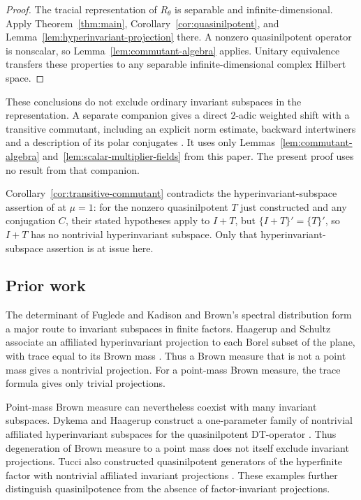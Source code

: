 \begin{proof}
The tracial representation of $R_\theta$ is separable and
infinite-dimensional.  Apply Theorem~\ref{thm:main},
Corollary~\ref{cor:quasinilpotent}, and
Lemma~\ref{lem:hyperinvariant-projection} there.  A nonzero
quasinilpotent operator is nonscalar, so
Lemma~\ref{lem:commutant-algebra} applies.  Unitary equivalence transfers
these properties to any separable infinite-dimensional complex Hilbert
space.
\end{proof}

These conclusions do not exclude ordinary invariant subspaces in the
representation.  A separate companion gives a direct $2$-adic weighted
shift with a transitive commutant, including an explicit norm estimate,
backward intertwiners and a description of its polar conjugates
\citep{direct-companion}.  It uses only
Lemmas~\ref{lem:commutant-algebra} and~\ref{lem:scalar-multiplier-fields}
from this paper.  The present proof uses no result from that companion.

\begin{remark}\label{rem:ckl}
Corollary~\ref{cor:transitive-commutant} contradicts the hyperinvariant-subspace assertion of
\citet[Corollary~2.8, p.~801]{cho-ko-lee} at $\mu=1$: for the nonzero
quasinilpotent $T$ just constructed and any conjugation $C$, their stated
hypotheses apply to $I+T$, but $\{I+T\}'=\{T\}'$, so $I+T$ has no
nontrivial hyperinvariant subspace.  Only that hyperinvariant-subspace assertion is at issue here.
\end{remark}

\subsection{Prior work}

The determinant of Fuglede and Kadison \citep{fuglede-kadison} and
Brown's spectral distribution \citep{brown} form a major route to
invariant subspaces in finite factors.  Haagerup and Schultz associate an
affiliated hyperinvariant projection to each Borel subset of the plane,
with trace equal to its Brown mass \citep[Theorem~1.1]{haagerup-schultz}.
Thus a Brown measure that is not a point mass gives a nontrivial
projection.  For a point-mass Brown measure, the trace formula gives
only trivial projections.

Point-mass Brown measure can nevertheless coexist with many invariant
subspaces.  Dykema and Haagerup construct a one-parameter family of
nontrivial affiliated hyperinvariant subspaces for the quasinilpotent
DT-operator \citep[Theorems~2.2 and~2.9]{dykema-haagerup}.
Thus degeneration of Brown measure to a point mass does not itself
exclude invariant projections.
Tucci also constructed quasinilpotent generators of the hyperfinite factor
with nontrivial affiliated invariant projections
\citep[Theorems~3.1 and~3.3 and the discussion following Theorem~3.3]{Tucci2008}.
These examples further distinguish quasinilpotence from the absence of
factor-invariant projections.

